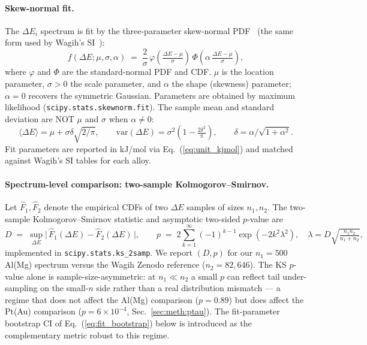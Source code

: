 \paragraph*{Skew-normal fit.}
The $\Delta E_i$ spectrum is fit by the three-parameter skew-normal
PDF~\cite{Azzalini1985} (the same form used by Wagih's
SI~\cite{Wagih2020}):
\begin{equation}\label{eq:skewnorm}
f(\Delta E; \mu, \sigma, \alpha)
\;=\; \frac{2}{\sigma} \, \varphi\!\left(\tfrac{\Delta E - \mu}{\sigma}\right)
\, \Phi\!\left(\alpha \, \tfrac{\Delta E - \mu}{\sigma}\right),
\end{equation}
where $\varphi$ and $\Phi$ are the standard-normal PDF and CDF.
$\mu$ is the location parameter, $\sigma > 0$ the scale parameter,
and $\alpha$ the shape (skewness) parameter; $\alpha = 0$ recovers
the symmetric Gaussian. Parameters are obtained by maximum likelihood
(\texttt{scipy.stats.skewnorm.fit}). The sample mean and standard
deviation are NOT $\mu$ and $\sigma$ when $\alpha \neq 0$:
\begin{equation}\label{eq:skewnorm_moments}
\langle \Delta E \rangle = \mu + \sigma \delta \sqrt{2/\pi},
\qquad
\mathrm{var}(\Delta E)  = \sigma^2 \!\left(1 - \tfrac{2 \delta^2}{\pi}\right),
\qquad
\delta = \alpha / \sqrt{1+\alpha^2}.
\end{equation}
Fit parameters are reported in kJ/mol via Eq.~(\ref{eq:unit_kjmol})
and matched against Wagih's SI tables for each alloy.



\paragraph*{Spectrum-level comparison: two-sample Kolmogorov--Smirnov.}
Let $\hat F_1, \hat F_2$ denote the empirical CDFs of two $\Delta E$
samples of sizes $n_1, n_2$. The two-sample Kolmogorov--Smirnov
statistic and asymptotic two-sided $p$-value are
\begin{equation}\label{eq:KS}
D \;=\; \sup_{\Delta E} \big|\, \hat F_1(\Delta E) - \hat F_2(\Delta E) \,\big|,
\qquad
p \;=\; 2 \sum_{k=1}^{\infty} (-1)^{k-1} \exp(-2 k^2 \lambda^2),
\quad
\lambda = D \sqrt{\tfrac{n_1 n_2}{n_1 + n_2}},
\end{equation}
implemented in \texttt{scipy.stats.ks\_2samp}. We report
$(D, p)$ for our $n_1 = 500$ Al(Mg) spectrum versus the Wagih Zenodo
reference ($n_2 = 82{,}646$). The KS $p$-value alone is
sample-size-asymmetric: at $n_1 \ll n_2$ a small $p$ can reflect
tail under-sampling on the small-$n$ side rather than a real
distribution mismatch — a regime that does not affect the Al(Mg)
comparison ($p = 0.89$) but does affect the Pt(Au) comparison
($p = 6\times 10^{-4}$, Sec.~\ref{sec:meth:ptau}). The
fit-parameter bootstrap CI of Eq.~(\ref{eq:fit_bootstrap}) below is
introduced as the complementary metric robust to this regime.


